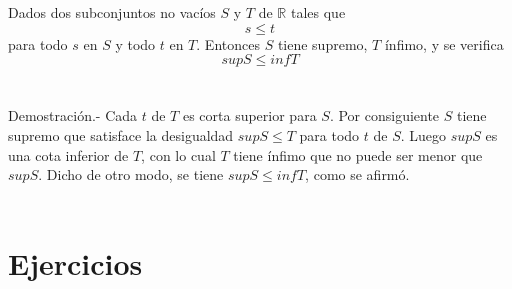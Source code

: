 \begin{teo}
Dados dos subconjuntos no vacíos $S$ y $T$ de $\mathbb{R}$ tales que $$s\leq t$$ para todo $s$ en $S$ y todo $t$ en $T$. Entonces $S$ tiene supremo, $T$ ínfimo, y se verifica $$supS\leq infT$$\\\\
Demostración.- \; Cada $t$ de $T$ es corta superior para $S$. Por consiguiente $S$ tiene supremo que satisface la desigualdad $supS\leq T$ para todo $t$ de $S$. Luego $supS$ es una cota inferior de $T$, con lo cual $T$ tiene ínfimo que no puede ser menor que $supS$. Dicho de otro modo, se tiene $supS\leq infT$, como se afirmó.\\\\
\end{teo}

\section{Ejercicios}
